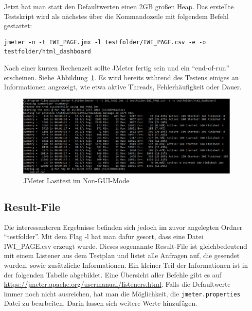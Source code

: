 \documentclass[a4paper,12pt]{article}
\newcommand{\codeInLine}[1]{%
\colorbox{graybackgroundColor}{\lstinline{#1}} %
}
\begin{document}
Jetzt hat man statt den Defaultwerten einen 2GB großen Heap. Das erstellte Testskript wird als nächstes über die Kommandozeile mit folgendem Befehl gestartet:

\begin{lstlisting}
jmeter -n -t IWI_PAGE.jmx -l testfolder/IWI_PAGE.csv -e -o testfolder/html_dashboard
\end{lstlisting} 

Nach einer kurzen Rechenzeit sollte JMeter fertig sein und ein "`end-of-run"' erscheinen. Siehe Abbildung~\ref{fig:start_jmeter_cmd}. Es wird bereits während des Testens einiges an Informationen angezeigt, wie etwa aktive Threads, Fehlerhäufigkeit oder Dauer. 

\begin{figure}[htb]%
 \centering
    \includegraphics[width=1\textwidth]{bilder/start_jmeter_cmd.png}
  \caption{JMeter Lasttest im Non-GUI-Mode}
  \label{fig:start_jmeter_cmd}
\end{figure}

\subsection{Result-File}
Die interessanteren Ergebnisse befinden sich jedoch im zuvor angelegten Ordner "`testfolder"'. Mit dem Flag -l hat man dafür gesort, dass eine Datei IWI\_PAGE.csv erzeugt wurde. Dieses sogenannte Result-File ist gleichbedeutend mit einem Listener aus dem Testplan und listet alle Anfragen auf, die gesendet wurden, sowie zusätzliche Informationen. Ein kleiner Teil der Informationen ist in der folgenden Tabelle abgebildet. Eine Übersicht aller Befehle gibt es auf \url{https://jmeter.apache.org/usermanual/listeners.html}. Falls die Defaultwerte immer noch nicht ausreichen, hat man die Möglichkeit, die \codeInLine{jmeter.properties} Datei zu bearbeiten. Darin lassen sich weitere Werte hinzufügen.  
\end{document}
